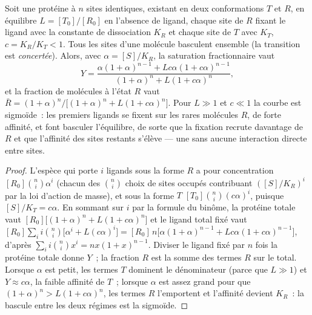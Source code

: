 \begin{theorem}\label{thm:b3:structural-biology:mwc}
Soit une protéine à $n$ sites identiques, existant en deux
conformations $T$ et $R$, en équilibre $L = [T_{0}]/[R_{0}]$ en
l'absence de ligand, chaque site de $R$ fixant le ligand avec la
constante de dissociation $K_{R}$ et chaque site de $T$ avec $K_{T}$,
$c = K_{R}/K_{T} < 1$. Tous les sites d'une molécule basculent ensemble
(la transition est \emph{concertée}). Alors, avec
$\alpha = [S]/K_{R}$, la saturation fractionnaire vaut
\[
Y = \frac{\alpha(1+\alpha)^{n-1} + Lc\alpha(1+c\alpha)^{n-1}}
{(1+\alpha)^{n} + L(1+c\alpha)^{n}},
\]
et la fraction de molécules à l'état $R$ vaut $\bar R =
(1+\alpha)^{n}/\bigl[(1+\alpha)^{n} + L(1+c\alpha)^{n}\bigr]$. Pour $L
\gg 1$ et $c \ll 1$ la courbe est sigmoïde~: les premiers ligands se
fixent sur les rares molécules $R$, de forte affinité, et font basculer
l'équilibre, de sorte que la fixation recrute davantage de $R$ et que
l'affinité des sites restants s'élève --- une  sans
aucune interaction directe entre sites.
\end{theorem}
\begin{proof}
L'espèce qui porte $i$ ligands sous la forme $R$ a pour concentration
$[R_{0}]\binom{n}{i}\alpha^{i}$ (chacun des $\binom{n}{i}$ choix de
sites occupés contribuant $([S]/K_{R})^{i}$ par la loi d'action de
masse), et sous la forme $T$ $[T_{0}]\binom{n}{i}(c\alpha)^{i}$,
puisque $[S]/K_{T} = c\alpha$. En sommant sur $i$ par la formule du
binôme, la protéine totale vaut
$[R_{0}]\bigl[(1+\alpha)^{n} + L(1+c\alpha)^{n}\bigr]$ et le ligand
total fixé vaut $[R_{0}]\sum_{i} i\binom{n}{i}\bigl[
\alpha^{i} + L(c\alpha)^{i}\bigr] = [R_{0}]\,n\bigl[\alpha(1+\alpha)^{n-1}
+ Lc\alpha(1+c\alpha)^{n-1}\bigr]$, d'après $\sum_{i} i\binom{n}{i}x^{i} =
nx(1+x)^{n-1}$. Diviser le ligand fixé par $n$ fois la protéine totale
donne $Y$~; la fraction $R$ est la somme des termes $R$ sur le total.
Lorsque $\alpha$ est petit, les termes $T$ dominent le dénominateur
(parce que $L \gg 1$) et $Y \approx c\alpha$, la faible affinité de
$T$~; lorsque $\alpha$ est assez grand pour que
$(1+\alpha)^{n} > L(1+c\alpha)^{n}$, les termes $R$ l'emportent et
l'affinité devient $K_{R}$~: la bascule entre les deux régimes est la
sigmoïde.
\end{proof}

